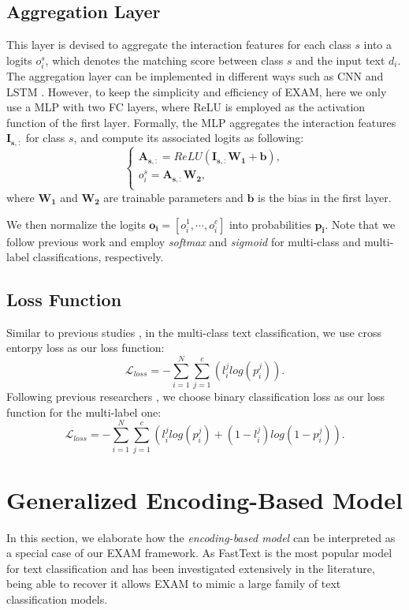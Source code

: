 \documentclass[letterpaper]{article} \usepackage{aaai19}  \usepackage{times}  \usepackage{helvet}  \usepackage{courier}  \usepackage{url}  \usepackage{graphicx}
\begin{document}
\subsection{Aggregation Layer}
This layer is devised to aggregate the interaction features for each class $s$ into a logits $o_i^s$, which denotes the matching score between class $s$ and the input text $d_i$. The aggregation layer can be implemented in different ways such as CNN \cite{diin} and LSTM \cite{BIMPM}. However, to keep the simplicity and efficiency of EXAM, here we only use a MLP with two FC layers, where ReLU is employed as the activation function of the first layer. Formally, the MLP aggregates the interaction features $\mathbf{I_{s,:}}$ for class $s$, and compute its associated logits as following:
\begin{equation}
\left\{
\begin{array}{lr}
\mathbf{A_{s,:}} = ReLU(\mathbf{I_{s,:}} \mathbf{W_{1}} + \mathbf{b}),\\
o_i^{s} = \mathbf{A_{s,:}} \mathbf{W_{2}},\\
\end{array}
\right.
\end{equation}
where $\mathbf{W_{1}}$ and $\mathbf{W_{2}}$ are trainable parameters and $\mathbf{b}$ is the bias in the first layer.

We then normalize the logits $\mathbf{o_i} = [o_i^1, \cdots, o_i^c]$ into probabilities $\mathbf{p_i}$. Note that we follow previous work \cite{fasttext} and employ \textit{softmax} and \textit{sigmoid} for multi-class and multi-label classifications, respectively.


\subsection{Loss Function}
Similar to previous studies \cite{vdcnn}, in the multi-class text classification, we use cross entorpy loss as our loss function:
\begin{equation}
\mathcal{L}_{loss} =  -\sum_{i=1}^{N}\sum_{j=1}^{c}(l_{i}^{j}log(p_{i}^{j})). 
\end{equation}
Following previous researchers \cite{fasttext}, we choose binary classification loss as our loss function for the multi-label one:
\begin{equation}
\mathcal{L}_{loss} =  -\sum_{i=1}^{N}\sum_{j=1}^{c}(l_{i}^{j}log(p_{i}^{j})+(1-l_{i}^{j})log(1-p_{i}^{j})). 
\end{equation}

\section{Generalized Encoding-Based Model}
In this section, we elaborate how the \textit{encoding-based model} can be interpreted as a special case of our EXAM framework. As FastText \cite{fasttext} is the most popular model for text classification and has been investigated extensively in the literature, being able to recover it allows EXAM to mimic a large family of text classification models.
\end{document}
